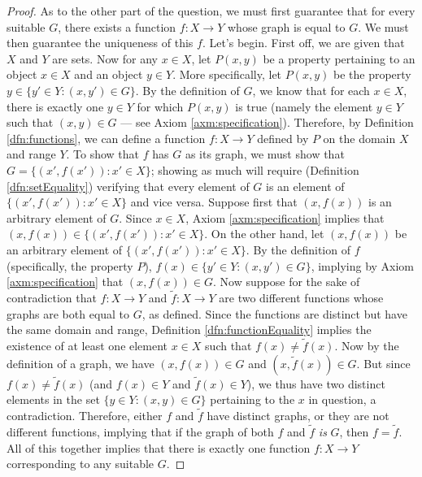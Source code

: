 \documentclass[../main.tex]{subfiles}
\begin{document}
\begin{enumerate}[ref={\thesection.\arabic*}]
\begin{proof}
        As to the other part of the question, we must first guarantee that for every suitable $G$, there exists a function $f:X\to Y$ whose graph is equal to $G$. We must then guarantee the uniqueness of this $f$. Let's begin. First off, we are given that $X$ and $Y$ are sets. Now for any $x\in X$, let $P(x,y)$ be a property pertaining to an object $x\in X$ and an object $y\in Y$. More specifically, let $P(x,y)$ be the property $y\in\{y'\in Y:(x,y')\in G\}$. By the definition of $G$, we know that for each $x\in X$, there is exactly one $y\in Y$ for which $P(x,y)$ is true (namely the element $y\in Y$ such that $(x,y)\in G$ --- see Axiom \ref{axm:specification}). Therefore, by Definition \ref{dfn:functions}, we can define a function $f:X\to Y$ defined by $P$ on the domain $X$ and range $Y$. To show that $f$ has $G$ as its graph, we must show that $G=\{(x',f(x')):x'\in X\}$; showing as much will require (Definition \ref{dfn:setEquality}) verifying that every element of $G$ is an element of $\{(x',f(x')):x'\in X\}$ and vice versa. Suppose first that $(x,f(x))$ is an arbitrary element of $G$. Since $x\in X$, Axiom \ref{axm:specification} implies that $(x,f(x))\in\{(x',f(x')):x'\in X\}$. On the other hand, let $(x,f(x))$ be an arbitrary element of $\{(x',f(x')):x'\in X\}$. By the definition of $f$ (specifically, the property $P$), $f(x)\in\{y'\in Y:(x,y')\in G\}$, implying by Axiom \ref{axm:specification} that $(x,f(x))\in G$. Now suppose for the sake of contradiction that $f:X\to Y$ and $\tilde{f}:X\to Y$ are two different functions whose graphs are both equal to $G$, as defined. Since the functions are distinct but have the same domain and range, Definition \ref{dfn:functionEquality} implies the existence of at least one element $x\in X$ such that $f(x)\neq\tilde{f}(x)$. Now by the definition of a graph, we have $(x,f(x))\in G$ and $(x,\tilde{f}(x))\in G$. But since $f(x)\neq\tilde{f}(x)$ (and $f(x)\in Y$ and $\tilde{f}(x)\in Y$), we thus have two distinct elements in the set $\{y\in Y:(x,y)\in G\}$ pertaining to the $x$ in question, a contradiction. Therefore, either $f$ and $\tilde{f}$ have distinct graphs, or they are not different functions, implying that if the graph of both $f$ and $\tilde{f}$ \emph{is} $G$, then $f=\tilde{f}$. All of this together implies that there is exactly one function $f:X\to Y$ corresponding to any suitable $G$.
    \end{proof}

\end{enumerate}
\end{document}
